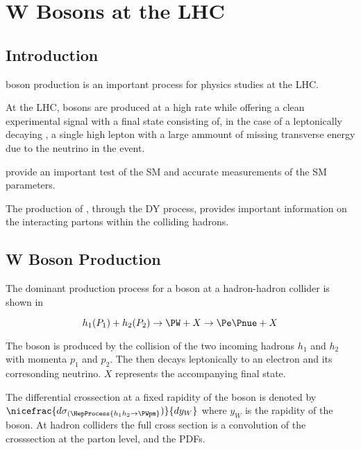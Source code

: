 \chapter{W Bosons at the LHC}

\section{Introduction}

\PW boson production is an important process for physics studies at the LHC.

At the \ac{LHC}, \PW bosons are produced at a high rate while offering a clean
experimental signal with a final state consisting of, in the case of a
leptonically decaying \PW, a single high \PT lepton with a large ammount of
missing transverse energy due to the neutrino in the event.

\PW provide an important test of the \ac{SM} and accurate measurements of the
\ac{SM} parameters. 

The production of \PW, through the \ac{DY} process, provides important
information on the interacting partons within the colliding hadrons.

\section{W Boson Production}

The dominant production process for a \PW boson at a hadron-hadron collider is
shown in 

\begin{equation}
  h_1(P_1) + h_2(P_2)
  \to 
  \PW + X
  \to
  \Pe \Pnue + X
  \label{wbos:dyproc}
\end{equation}

The \PW boson is produced by the collision of the two incoming hadrons $h_1$
and $h_2$ with momenta $p_1$ and $p_2$. The \PW then decays leptonically to an
electron and its corresonding neutrino. $X$ represents the accompanying final
state.




The differential crossection at a fixed rapidity of the \PW boson is denoted by
$\nicefrac{d\sigma_{(\HepProcess{h_1 h_2 \to \PWpm}})}{dy_W}$ where $y_W$ is
the rapidity of the \PW boson. 
At hadron colliders the full cross section is a convolution of the crosssection
at the parton level, and the \acp{PDF}.


